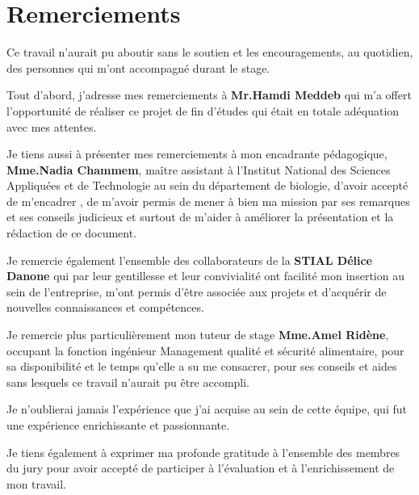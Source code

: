 \chapter*{Remerciements}

Ce travail n'aurait pu aboutir sans le soutien et les encouragements, au quotidien, des personnes qui m'ont accompagné durant le stage.\newline


Tout d’abord, j’adresse mes remerciements à \textbf{Mr.Hamdi Meddeb} qui m’a offert l’opportunité  de réaliser ce projet de fin d’études qui était en totale adéquation avec mes attentes.\newline


Je tiens aussi à présenter mes remerciements à mon encadrante pédagogique, \textbf{Mme.Nadia Chammem}, maître assistant à l’Institut National des Sciences Appliquées et de  Technologie au sein du département de biologie, d’avoir accepté de m’encadrer , de m’avoir permis de mener à bien ma mission par ses remarques et ses conseils judicieux et surtout de m’aider à améliorer  la présentation et la rédaction de ce document.\newline



 Je  remercie également  l’ensemble des collaborateurs de la \textbf{STIAL Délice Danone} qui par leur gentillesse et leur convivialité ont facilité mon insertion au sein de l’entreprise, m’ont permis d’être associée aux projets et d’acquérir de nouvelles connaissances et compétences.\newline


 Je remercie plus particulièrement mon tuteur de stage \textbf{Mme.Amel Ridène}, occupant la fonction  ingénieur Management qualité et sécurité alimentaire, pour sa disponibilité et le temps qu’elle a su me consacrer, pour ses conseils et aides sans lesquels ce travail n’aurait pu être accompli.\newline


 Je n’oublierai jamais l’expérience que j’ai acquise au sein de cette équipe, qui fut une expérience enrichissante et passionnante.\newline

 Je tiens également à exprimer ma profonde gratitude à l’ensemble des membres du jury  pour avoir accepté de participer à l’évaluation et à l’enrichissement de mon travail.
